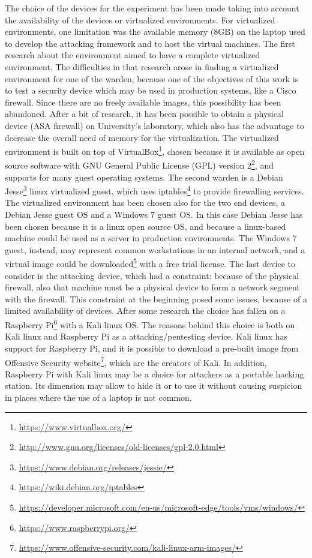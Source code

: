 \documentclass[12pt]{article}
\begin{document}
The choice of the devices for the experiment has been made taking into account the availability of the devices or virtualized environments. For virtualized environments, one limitation was the available memory (8GB) on the laptop used to develop the attacking framework and to host the virtual machines. The first research about the environment aimed to have a complete virtualized environment. The difficulties in that research arose in finding a virtualized environment for one of the warden, because one of the objectives of this work is to test a security device which may be used in production systems, like a Cisco firewall. Since there are no freely available images, this possibility has been abandoned. After a bit of research, it has been possible to obtain a physical device (ASA firewall) on University's laboratory, which also has the advantage to decrease the overall need of memory for the virtualization. The virtualized environment is built on top of VirtualBox\footnote{\url{https://www.virtualbox.org/}}, chosen because it is available as open source software with GNU General Public License (GPL) version 2\footnote{\url{http://www.gnu.org/licenses/old-licenses/gpl-2.0.html}}, and supports for many guest operating systems. The second warden is a Debian Jesse\footnote{\url{https://www.debian.org/releases/jessie/}} linux virtualized guest, which uses iptables\footnote{\url{https://wiki.debian.org/iptables}} to provide firewalling services. The virtualized environment has been chosen also for the two end devices, a Debian Jesse guest OS and a Windows 7 guest OS. In this case Debian Jesse has been chosen because it is a linux open source OS, and because a linux-based machine could be used as a server in production environments. The Windows 7 guest, instead, may represent common workstations in an internal network, and a virtual image could be downloaded\footnote{\url{https://developer.microsoft.com/en-us/microsoft-edge/tools/vms/windows/}} with a free trial license. The last device to consider is the attacking device, which had a constraint: because of the physical firewall, also that machine must be a physical device to form a network segment with the firewall. This constraint at the beginning posed some issues, because of a limited availability of devices. After some research the choice has fallen on a Raspberry Pi\footnote{\url{https://www.raspberrypi.org/}} with a Kali linux OS. The reasons behind this choice is both on Kali linux and Raspberry Pi as a attacking/pentesting device. Kali linux has support for Raspberry Pi, and it is possible to download a pre-built image from Offensive Security website\footnote{\url{https://www.offensive-security.com/kali-linux-arm-images/}}, which are the creators of Kali. In addition, Raspberry Pi with Kali linux may be a choice for attackers as a portable hacking station. Its dimension may allow to hide it or to use it without causing suspicion in places where the use of a laptop is not common.
\end{document}
